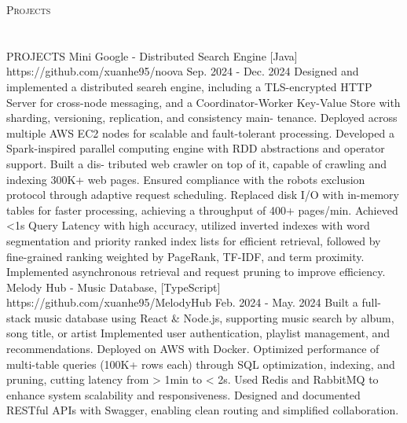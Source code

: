 \documentclass[a4paper]{article}
\newcommand{\lineunder} {
    \vspace*{-8pt} \\
    \hspace*{-18pt} \hrulefill \\
}
\newcommand{\header} [1] {
    {\hspace*{-18pt}\vspace*{6pt} \textsc{#1}}
    \vspace*{-6pt} \lineunder
}
\begin{document}
\header{Projects}
\hfill 
\\
 PROJECTS\newline%
Mini Google {-} Distributed Search Engine {[}Java{]} https://github.com/xuanhe95/noova\newline%
Sep. 2024 {-} Dec. 2024\newline%
Designed and implemented a distributed seareh engine, including a TLS{-}encrypted HTTP Server for cross{-}node\newline%
messaging, and a Coordinator{-}Worker Key{-}Value Store with sharding, versioning, replication, and consistency main{-}\newline%
tenance. Deployed across multiple AWS EC2 nodes for scalable and fault{-}tolerant processing.\newline%
Developed a Spark{-}inspired parallel computing engine with RDD abstractions and operator support. Built a dis{-}\newline%
tributed web crawler on top of it, capable of crawling and indexing 300K+ web pages. Ensured compliance with the\newline%
robots exclusion protocol through adaptive request scheduling. Replaced disk I/O with in{-}memory tables for faster\newline%
processing, achieving a throughput of 400+ pages/min.\newline%
Achieved <1s Query Latency with high accuracy, utilized inverted indexes with word segmentation and priority\newline%
ranked index lists for efficient retrieval, followed by fine{-}grained ranking weighted by PageRank, TF{-}IDF, and term\newline%
proximity. Implemented asynchronous retrieval and request pruning to improve efficiency.\newline%
Melody Hub {-} Music Database, {[}TypeScript{]} https://github.com/xuanhe95/MelodyHub\newline%
Feb. 2024 {-} May. 2024\newline%
Built a full{-}stack music database using React \& Node.js, supporting music search by album, song title, or artist\newline%
Implemented user authentication, playlist management, and recommendations. Deployed on AWS with Docker.\newline%
Optimized performance of multi{-}table queries (100K+ rows each) through SQL optimization, indexing, and pruning,\newline%
cutting latency from > 1min to < 2s. Used Redis and RabbitMQ to enhance system scalability and responsiveness.\newline%
Designed and documented RESTful APIs with Swagger, enabling clean routing and simplified collaboration. \\
\vspace*{2mm}
\end{document}
